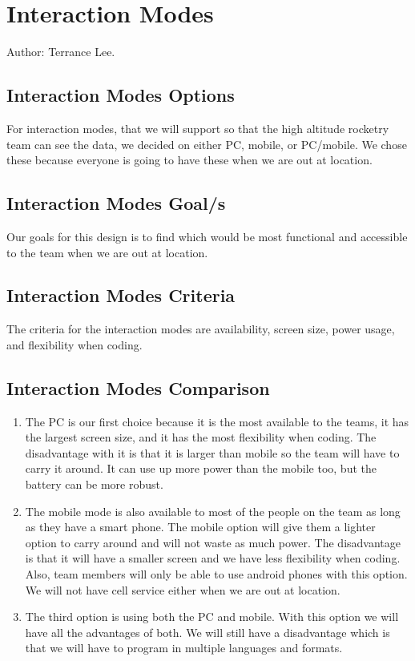 \documentclass[10pt,draftclsnofoot,onecolumn]{IEEEtran}
\begin{document}
     	\section{Interaction Modes}
	Author: Terrance Lee.
	\subsection{Interaction Modes Options}
 	For interaction modes, that we will support so that the high altitude rocketry team can see the data, we decided on either PC,
	mobile, or PC/mobile. 
	We chose these because everyone is going to have these when we are out at location.  

 	\subsection{Interaction Modes Goal/s}
  	Our goals for this design is to find which would be most functional and accessible to the team when we are out at location. 
  	\subsection{Interaction Modes Criteria}
   	The criteria for the interaction modes are availability, screen size, power usage, and flexibility when coding.  

   	\subsection{Interaction Modes Comparison}
   	\begin{enumerate}
   	\item
    	The PC is our first choice because it is the most available to the teams, it has the largest screen size, and it has the most
	flexibility when coding. The disadvantage with it is that it is larger than mobile so the team will have to carry it around. 
	It can use up more power than the mobile too, but the battery can be more robust.\\ 
   	\item
     	The mobile mode is also available to most of the people on the team as long as they have a smart phone. 
	The mobile option will give them a lighter option to carry around and will not waste as much power. 
	The disadvantage is that it will have a smaller screen and we have less flexibility when coding. 
	Also, team members will only be able to use android phones with this option. 
	We will not have cell service either when we are out at location.\\ 
   	\item
    	The third option is using both the PC and mobile. 
	With this option we will have all the advantages of both. 
	We will still have a disadvantage which is that we will have to program in multiple languages and formats. 
   	\end {enumerate}
\end{document}
